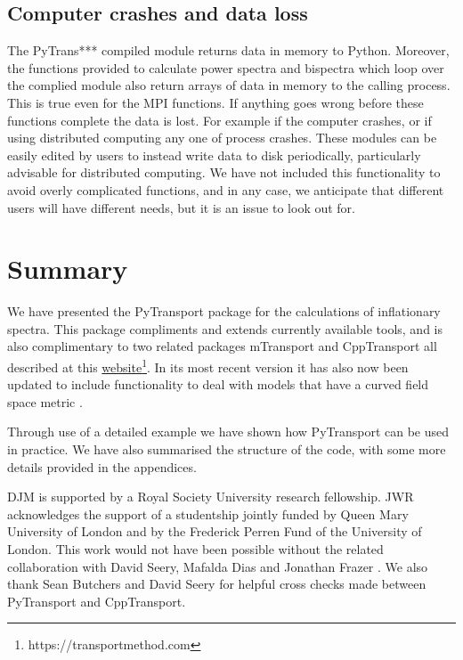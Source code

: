 \documentclass[10pt,
amsmath,amssymb,
aps,prd,nofootinbib,eqsecnum,a4paper]{revtex4}
\begin{document}
\subsection{Computer crashes and data loss}

The { PyTrans***} compiled module returns data in memory to Python. Moreover, the functions provided 
to calculate power spectra and bispectra which loop over the complied module also return 
arrays of data in memory to the calling process. This is true even for the MPI functions. If anything goes wrong before these functions complete the data is lost. For example if the computer crashes, or if using distributed computing any 
one of process crashes. These modules can be easily edited by users to instead write data to disk 
periodically, particularly advisable for distributed computing. We have not 
included this functionality to avoid overly complicated functions, and in any case, we anticipate that 
different users will have different needs, but it is an issue to look out for.


\section{Summary}

We have presented the PyTransport package for the calculations of inflationary spectra. This package 
compliments and extends currently available tools, and is also complimentary to two related packages 
mTransport \cite{Dias:2015rca} and CppTransport \cite{Dias:2016rjq,Seery:2016lko}  all described at this \href{https://transportmethod.com}{website}\footnote{https://transportmethod.com}. In its most recent version it has also now been updated to include 
functionality to deal with models that have a curved field space metric \cite{xxx2}.

Through use of a detailed example we have shown how PyTransport can be used in practice. We have also summarised the structure of the code, with some more details provided in the appendices.

\begin{acknowledgments}
DJM is supported by a Royal Society University research fellowship. JWR acknowledges the support of a studentship 
jointly funded by Queen Mary University 
of London and by the Frederick Perren Fund of the University of London. This work would not have been possible without 
the related collaboration with David Seery, Mafalda Dias and Jonathan Frazer \cite{Dias:2016rjq}. We also 
thank Sean Butchers and David Seery for helpful cross checks  made between PyTransport and CppTransport.
\end{acknowledgments}
\end{document}

